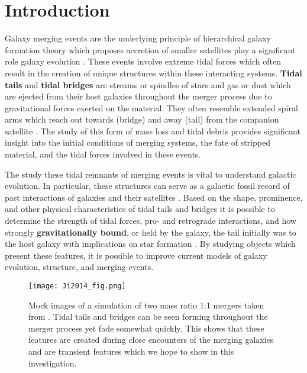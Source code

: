 \documentclass[fleqn,usenatbib]{mnras}
\begin{document}

\section{Introduction}

Galaxy merging events are the underlying principle of hierarchical galaxy formation theory which proposes accretion of smaller satellites play a significant role galaxy evolution \cite{Wang_Hammer_Athanassoula_Puech_Yang_Flores_2012}. These events involve extreme tidal forces which often result in the creation of unique structures within these interacting systems. \textbf{Tidal tails} and \textbf{tidal bridges} are streams or spindles of stars and gas or dust which are ejected from their host galaxies throughout the merger process due to gravitational forces exerted on the material. They often resemble extended spiral arms which reach out towards (bridge) and away (tail) from the companion satellite \cite{Toomre_Toomre_1972}. The study of this form of mass loss and tidal debris provides significant insight into the initial conditions of merging systems, the fate of stripped material, and the tidal forces involved in these events.

The study these tidal remnants of merging events is vital to understand galactic evolution. In particular, these structures can serve as a galactic fossil record of past interactions of galaxies and their satellites \cite{Wang_Hammer_Athanassoula_Puech_Yang_Flores_2012}. Based on the shape, prominence, and other physical characteristics of tidal tails and bridges it is possible to determine the strength of tidal forces, pro- and retrograde interactions, and how strongly \textbf{gravitationally bound}, or held by the galaxy, the tail initially was to the host galaxy with implications on star formation \cite{Privon_Barnes_Evans_Hibbard_Yun_Mazzarella_Armus_Surace_2013}. By studying objects which present these features, it is possible to improve current models of galaxy evolution, structure, and merging events. 

\begin{figure}
	\texttt{[image: Ji2014\_fig.png]}
    \caption{Mock images of a simulation of two mass ratio 1:1 mergers taken from \cite{Ji_Peirani_Yi_2014}. Tidal tails and bridges can be seen forming throughout the merger process yet fade somewhat quickly. This shows that these features are created during close encounters of the merging galaxies and are transient features which we hope to show in this investigation.}
    \label{fig:Ji2014_fig}
\end{figure}
\end{document}
